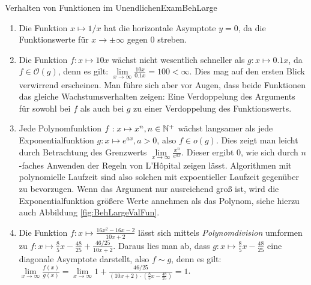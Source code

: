 \begin{example}{Verhalten von Funktionen im Unendlichen}{ExamBehLarge}
    \begin{enumerate}
        \item Die Funktion $x \mapsto 1/x$ hat die horizontale Asymptote $y=0$, da die Funktionswerte für $x \to \pm\infty$ gegen $0$ streben.
        \item Die Funktion $f: x \mapsto 10x$ wächst nicht wesentlich schneller als $g: x \mapsto 0.1x$, da $f \in \mathcal{O}(g)$, denn es gilt: $\lim\limits_{x\to\infty} \frac{10x}{0.1x} = 100 < \infty$. Dies mag auf den ersten Blick verwirrend erscheinen. Man führe sich aber vor Augen, dass beide Funktionen das gleiche Wachstumsverhalten zeigen: Eine Verdoppelung des Arguments für sowohl bei $f$ als auch bei $g$ zu einer Verdoppelung des Funktionswerts.
        \item Jede Polynomfunktion $f: x \mapsto x^n, n \in \mathbb{N}^+$ wächst langsamer als jede Exponentialfunktion $g: x \mapsto e^{ax}, a > 0$, also $f \in o(g)$. Dies zeigt man leicht durch Betrachtung des Grenzwerts $\lim\limits_{x\to\infty} \frac{x^n}{e^{ax}}$. Dieser ergibt $0$, wie sich durch $n$-faches Anwenden der Regeln von L'Hôpital zeigen lässt. Algorithmen mit polynomielle Laufzeit sind also solchen mit expoentieller Laufzeit gegenüber zu bevorzugen. Wenn das Argument nur ausreichend groß ist, wird die Exponentialfunktion größere Werte annehmen als das Polynom, siehe hierzu auch Abbildung \ref{fig:BehLargeValFun}.
        \item Die Funktion $f: x \mapsto \frac{16x^2-16x-2}{10x+2}$ lässt sich mittels \emph{Polynomdivision} umformen zu $f: x \mapsto \frac{8}{5}x - \frac{48}{25} + \frac{46/25}{10x+2}$. Daraus lies man ab, dass $g: x \mapsto \frac{8}{5}x - \frac{48}{25}$ eine diagonale Asymptote darstellt, also $f \sim g$, denn es gilt: $\lim\limits_{x\to\infty} \frac{f(x)}{g(x)} = \lim\limits_{x\to\infty} 1 + \frac{46/25}{(10x+2)\cdot(\frac{8}{5}x - \frac{48}{25})} = 1$.
    \end{enumerate}
\end{example}

